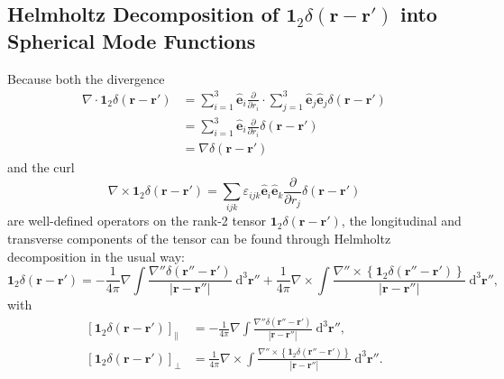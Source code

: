 \documentclass{article}
\begin{document}
\subsection{Helmholtz Decomposition of $\bm{1}_2\delta(\mathbf{r} - \mathbf{r}')$ into Spherical Mode Functions}\label{sec:helmholtzDelta}

Because both the divergence 
\begin{equation}
\begin{split}
\nabla\cdot\mathbf{1}_2\delta(\mathbf{r} - \mathbf{r}') &= \sum_{i = 1}^3\hat{\mathbf{e}}_i\frac{\partial}{\partial r_i}\cdot\sum_{j = 1}^3\hat{\mathbf{e}}_j\hat{\mathbf{e}}_j\delta(\mathbf{r} - \mathbf{r}')\\
&= \sum_{i = 1}^3\hat{\mathbf{e}}_i\frac{\partial}{\partial r_i}\delta(\mathbf{r} - \mathbf{r}')\\
&= \nabla\delta(\mathbf{r} - \mathbf{r}')
\end{split}
\end{equation}
and the curl
\begin{equation}
\nabla\times\bm{1}_2\delta(\mathbf{r} - \mathbf{r}') = \sum_{ijk}\varepsilon_{ijk}\hat{\mathbf{e}}_i\hat{\mathbf{e}}_k\frac{\partial}{\partial r_j}\delta(\mathbf{r} - \mathbf{r}')
\end{equation}
are well-defined operators on the rank-2 tensor $\bm{1}_2\delta(\mathbf{r} - \mathbf{r}')$, the longitudinal and transverse components of the tensor can be found through Helmholtz decomposition in the usual way:
\begin{equation}
\bm{1}_2\delta(\mathbf{r} - \mathbf{r}') = -\frac{1}{4\pi}\nabla\int\frac{\nabla''\delta(\mathbf{r}''-\mathbf{r}')}{|\mathbf{r} - \mathbf{r}''|}\;\mathrm{d}^3\mathbf{r}'' + \frac{1}{4\pi}\nabla\times\int\frac{\nabla''\times\left\{\bm{1}_2\delta(\mathbf{r}'' - \mathbf{r}')\right\}}{|\mathbf{r} - \mathbf{r}''|}\;\mathrm{d}^3\mathbf{r}'',
\end{equation}
with
\begin{equation}
\begin{split}
\left[\bm{1}_2\delta(\mathbf{r} - \mathbf{r}')\right]_\parallel &= -\frac{1}{4\pi}\nabla\int\frac{\nabla''\delta(\mathbf{r}''-\mathbf{r}')}{|\mathbf{r} - \mathbf{r}''|}\;\mathrm{d}^3\mathbf{r}'',\\
\left[\bm{1}_2\delta(\mathbf{r} - \mathbf{r}')\right]_\perp &= \frac{1}{4\pi}\nabla\times\int\frac{\nabla''\times\left\{\bm{1}_2\delta(\mathbf{r}'' - \mathbf{r}')\right\}}{|\mathbf{r} - \mathbf{r}''|}\;\mathrm{d}^3\mathbf{r}''.
\end{split}
\end{equation}
\end{document}
